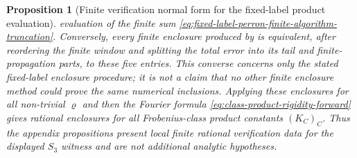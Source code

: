 \documentclass[11pt,a4paper]{amsart}
\theoremstyle{plain}
\newtheorem{proposition}[theorem]{Proposition}
\theoremstyle{definition}
\theoremstyle{remark}
\begin{document}
\begin{proposition}[Finite verification normal form for the fixed-label product evaluation]
  evaluation of the finite sum
  \eqref{eq:fixed-label-perron-finite-algorithm-truncation}.  Conversely,
  every finite enclosure produced by
   is equivalent, after
  reordering the finite window and splitting the total error into its tail and
  finite-propagation parts, to these five entries.  This converse concerns only the stated fixed-label enclosure procedure; it is
  not a claim that no other finite enclosure method could prove the same
  numerical inclusions.  Applying these
  enclosures for all non-trivial \(\varrho\) and then the Fourier formula
  \eqref{eq:class-product-rigidity-forward} gives rational enclosures for all
  Frobenius-class product constants \((K_C)_C\).  Thus the appendix propositions present local finite rational verification data for the displayed \(S_3\) witness and are
  not additional analytic hypotheses.
\end{proposition}
\end{document}
